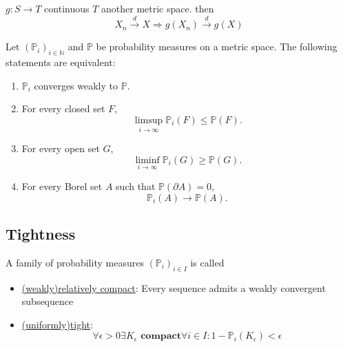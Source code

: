 \begin{theorem}
	$g: S \rightarrow T$ continuous $T$ another metric space. then
	\begin{equation*}
		X_n \overset{d}{\rightarrow} X \Rightarrow g(X_n) \overset{d}{\rightarrow}g(X)
	\end{equation*}
\end{theorem}

\begin{theorem}
Let $(\mathbb{P}_i)_{i \in \mathbb{N}}$ and $\mathbb{P}$ be probability measures on a metric space. The following statements are equivalent:
\begin{enumerate}
	\item $\mathbb{P}_i$ converges weakly to $\mathbb{P}$.
	\item For every closed set $F$,
	\[
		\limsup_{i \to \infty} \mathbb{P}_i(F) \leq \mathbb{P}(F).
	\]
	\item For every open set $G$,
	\[
		\liminf_{i \to \infty} \mathbb{P}_i(G) \geq \mathbb{P}(G).
	\]
	\item For every Borel set $A$ such that $\mathbb{P}(\partial A) = 0$,
	\[
		\mathbb{P}_i(A) \rightarrow \mathbb{P}(A).
	\]
\end{enumerate}
\end{theorem}


\subsection{Tightness}
\begin{definition}[]
A family of probability measures $(\mathbb{P}_i)_{i \in I}$ is called 
\begin{itemize}
	\item \underline{(weakly)relatively compact}: Every sequence admits a weakly convergent subsequence
	\item \underline{(uniformly)tight}:
	\begin{equation*}
		\forall \epsilon > 0 \exists K_\epsilon \textbf{ compact} \forall i \in I: 1-\mathbb{P}_i(K_\epsilon) < \epsilon
	\end{equation*}
\end{itemize}
\end{definition}

